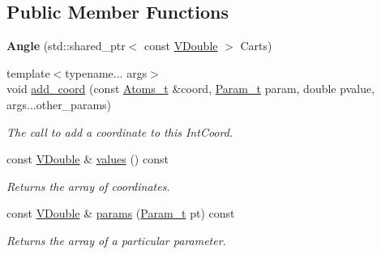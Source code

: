 \subsection*{Public Member Functions}
\begin{DoxyCompactItemize}
\item 
{\bfseries Angle} (std\+::shared\+\_\+ptr$<$ const \hyperlink{classFManII_1_1IntCoords_af42df2795dec16350f908cfd5ac2ef06}{V\+Double} $>$ Carts)\hypertarget{classFManII_1_1Angle_af4d80ba2399fd3b569c427ab2afba0ad}{}\label{classFManII_1_1Angle_af4d80ba2399fd3b569c427ab2afba0ad}

\item 
{\footnotesize template$<$typename... args$>$ }\\void \hyperlink{classFManII_1_1IntCoords_aaa13717daa2c47a00c56e8dcb18896b6}{add\+\_\+coord} (const \hyperlink{classFManII_1_1IntCoords_a59ab25571f774fca97644a2ce5ade359}{Atoms\+\_\+t} \&coord, \hyperlink{namespaceFManII_ab331802fde4c5f2564443f1704c25363}{Param\+\_\+t} param, double pvalue, args...\+other\+\_\+params)
\begin{DoxyCompactList}\small\item\em The call to add a coordinate to this Int\+Coord. \end{DoxyCompactList}\item 
const \hyperlink{classFManII_1_1IntCoords_af42df2795dec16350f908cfd5ac2ef06}{V\+Double} \& \hyperlink{classFManII_1_1IntCoords_a8b36508bebeb262d2c41bed1301ad9f9}{values} () const \hypertarget{classFManII_1_1IntCoords_a8b36508bebeb262d2c41bed1301ad9f9}{}\label{classFManII_1_1IntCoords_a8b36508bebeb262d2c41bed1301ad9f9}

\begin{DoxyCompactList}\small\item\em Returns the array of coordinates. \end{DoxyCompactList}\item 
const \hyperlink{classFManII_1_1IntCoords_af42df2795dec16350f908cfd5ac2ef06}{V\+Double} \& \hyperlink{classFManII_1_1IntCoords_ac107ad541179d838052f37538883671a}{params} (\hyperlink{namespaceFManII_ab331802fde4c5f2564443f1704c25363}{Param\+\_\+t} pt) const \hypertarget{classFManII_1_1IntCoords_ac107ad541179d838052f37538883671a}{}\label{classFManII_1_1IntCoords_ac107ad541179d838052f37538883671a}

\begin{DoxyCompactList}\small\item\em Returns the array of a particular parameter. \end{DoxyCompactList}\end{DoxyCompactItemize}
